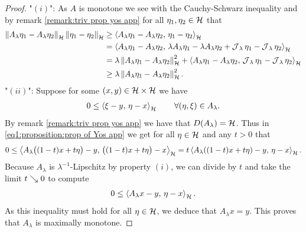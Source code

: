 \begin{proof}
	"$(i)$": As $ A $ is monotone we see with the Cauchy-Schwarz inequality
	and by remark \ref{remark:triv prop yos app} for all 
	$ \eta_1,\eta_2\in\mathcal{H} $ that
	\begin{align*}
		\left\Vert A_\lambda \eta_1-A_\lambda \eta_2\right\Vert_{\mathcal{H}}\left\Vert \eta_1-\eta_2\right\Vert_{\mathcal{H}}
		&\geq \left\langle A_\lambda \eta_1-A_\lambda \eta_2,\,\eta_1-\eta_2\right\rangle_{\mathcal{H}}\\
		&= \left\langle A_\lambda \eta_1-A_\lambda \eta_2,\,\lambda A_\lambda \eta_1
		-\lambda A_\lambda \eta_2+\operatorname{\mathcal{J}}_\lambda \eta_1-\operatorname{\mathcal{J}}_\lambda\eta_2\right\rangle_{\mathcal{H}}\\
		&= \lambda \left\Vert A_\lambda \eta_1-A_\lambda \eta_2\right\Vert_{\mathcal{H}}^2+
		\left\langle A_\lambda \eta_1-A_\lambda \eta_2,\,\operatorname{\mathcal{J}}_\lambda \eta_1-\operatorname{\mathcal{J}}_\lambda\eta_2\right\rangle_{\mathcal{H}}\\
		&\geq \lambda \left\Vert A_\lambda \eta_1-A_\lambda \eta_2\right\Vert_{\mathcal{H}}^2.
	\end{align*}
	"$ (ii) $": Suppose for some
	$ (x,y)\in\mathcal{H}\times\mathcal{H} $ we have
	\begin{align}\label{eq1:proposition:prop of Yos app}
		0\leq \left\langle \xi-y,\,\eta-x\right\rangle_{\mathcal{H}}
		\qquad \forall (\eta,\xi)\in A_\lambda.
	\end{align}
	By remark \ref{remark:triv prop yos app} we have that $ D(A_\lambda)=\mathcal{H} $.
	Thus in \eqref{eq1:proposition:prop of Yos app} we get
	for all $ \eta\in\mathcal{H} $ and any $ t>0 $ that
	\begin{align*}
		0
		\leq \left\langle A_\lambda\big((1-t)x+t\eta\big)-y,\,\big((1-t)x+t\eta\big)-x\right\rangle_{\mathcal{H}}
		= t\left\langle A_\lambda((1-t)x+t\eta)-y,\,\eta-x\right\rangle_{\mathcal{H}}.
	\end{align*}
	Because $ A_\lambda $ is $ \lambda^{-1} $-Lipschitz by property $ (i) $, 
	we can divide by $ t $ and take the limit $ t\searrow 0 $ to compute
	\begin{align*}
		0\leq \left\langle A_\lambda x-y,\,\eta-x\right\rangle_{\mathcal{H}}.
	\end{align*}
	As this inequality must hold for all $ \eta\in\mathcal{H} $, we deduce that 
	$ A_\lambda x=y $. 
	This proves that $ A_\lambda  $
	is maximally monotone.\smallskip
	

\end{proof}
